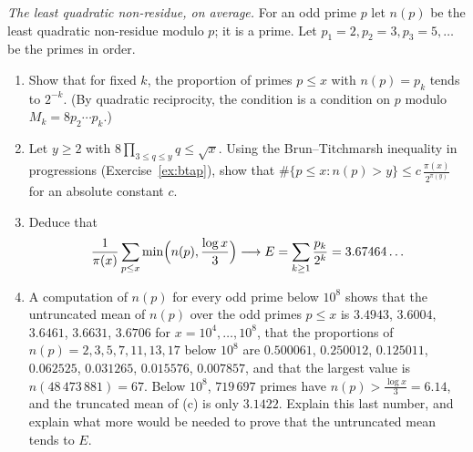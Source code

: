 \begin{exercise}[$\star\star\star$]\label{pb:erdosnp}
\emph{The least quadratic non-residue, on average.} For an odd prime $p$ let $n(p)$ be the least quadratic non-residue modulo $p$; it is a prime. Let
$p_1=2,p_2=3,p_3=5,\dots$ be the primes in order.
\begin{enumerate}[label=(\alph*)]
\item Show that for fixed $k$, the proportion of primes $p\le x$ with $n(p)=p_k$ tends to $2^{-k}$. (By quadratic reciprocity, the condition is a condition on $p$ modulo
$M_k=8p_2\cdots p_k$.)
\item Let $y\ge2$ with $8\prod_{3\le q\le y}q\le\sqrt x$. Using the Brun--Titchmarsh inequality in progressions (Exercise~\ref{ex:btap}), show that
$\#\{p\le x:n(p)>y\}\le c\,\frac{\pi(x)}{2^{\pi(y)}}$ for an absolute constant $c$.
\item Deduce that
\[
\frac1{\pi(x)}\sum_{p\le x}\min\Bigl(n(p),\frac{\log x}3\Bigr)\longrightarrow E=\sum_{k\ge1}\frac{p_k}{2^k}=3.67464\ldots
\]
\item A computation of $n(p)$ for every odd prime below $10^8$ shows that the untruncated mean of $n(p)$ over the odd primes $p\le x$ is $3.4943$, $3.6004$, $3.6461$, $3.6631$, $3.6706$ for $x=10^4,\dots,10^8$, that
the proportions of $n(p)=2,3,5,7,11,13,17$ below $10^8$ are $0.500061$, $0.250012$, $0.125011$, $0.062525$, $0.031265$, $0.015576$, $0.007857$, and that the largest value is
$n(48\,473\,881)=67$. Below $10^8$, $719\,697$ primes have $n(p)>\frac{\log x}3=6.14$, and the truncated mean of (c) is only $3.1422$. Explain this last number, and
explain what more would be needed to prove that the untruncated mean tends to $E$.
\end{enumerate}
\end{exercise}

